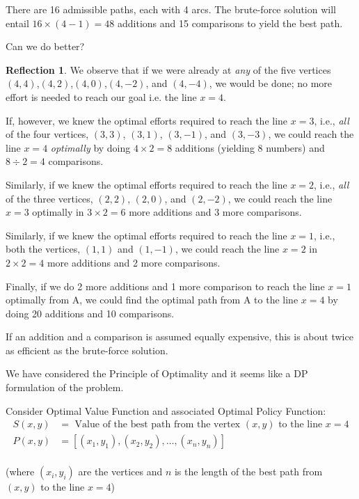 \documentclass[english,notitlepage,smartquotes]{hgbreport}
\theoremstyle{definition}
\theoremstyle{definition}
\theoremstyle{remark}
\theoremstyle{definition}
\theoremstyle{plain}
\theoremstyle{definition}
\newtheorem{reflection}{Reflection}
\begin{document}
There are 16 admissible paths, each with 4 arcs. The brute-force solution will entail $16\times(4-1)=48$ additions and 15 comparisons to yield the best path. 

Can we do better?

\begin{reflection}
We observe that if we were already at \emph{any} of the five vertices $(4,4)$,$(4,2)$,$(4,0)$,$(4,-2)$, and $(4,-4)$, we would be done; no more effort is needed to reach our goal i.e. the line $x=4$. 

If, however, we knew the optimal efforts required to reach the line $x=3$, i.e., \emph{all} of the four vertices, $(3,3)$, $(3,1)$, $(3,-1)$, and $(3,-3)$, we could reach the line $x=4$ \emph{optimally} by doing $4\times2=8$ additions (yielding 8 numbers) and $8\div2=4$ comparisons.

Similarly, if we knew the optimal efforts required to reach the line $x=2$, i.e., \emph{all} of the three vertices, $(2,2)$, $(2,0)$, and $(2,-2)$, we could reach the line $x=3$ optimally in $3\times2=6$ more additions and 3 more comparisons.

Similarly, if we knew the optimal efforts required to reach the line $x=1$, i.e., both the vertices, $(1,1)$ and $(1,-1)$, we could reach the line $x=2$ in $2\times2=4$ more additions and 2 more comparisons.

Finally, if we do 2 more additions and 1 more comparison to reach the line $x=1$ optimally from A, we could find the optimal path from A to the line $x=4$ by doing 20 additions and 10 comparisons.

If an addition and a comparison is assumed equally expensive, this is about twice as efficient as the brute-force solution.

We have considered the Principle of Optimality and it seems like a DP formulation of the problem.
\end{reflection}

Consider Optimal Value Function and associated Optimal Policy Function:
\begin{equation}
\begin{aligned}
S(x,y)&=\text{ Value of the best path from the vertex $(x,y)$ to the line $x=4$}\\
P(x,y)&=[(x_1,y_1),(x_2,y_2),\dots,(x_n,y_n)] \\
\label{eq:p11ovf}
\end{aligned}
\end{equation}

(where $(x_i,y_i)$ are the vertices and $n$ is the length of the best path from $(x,y)$ to the line $x=4$)
\end{document}
